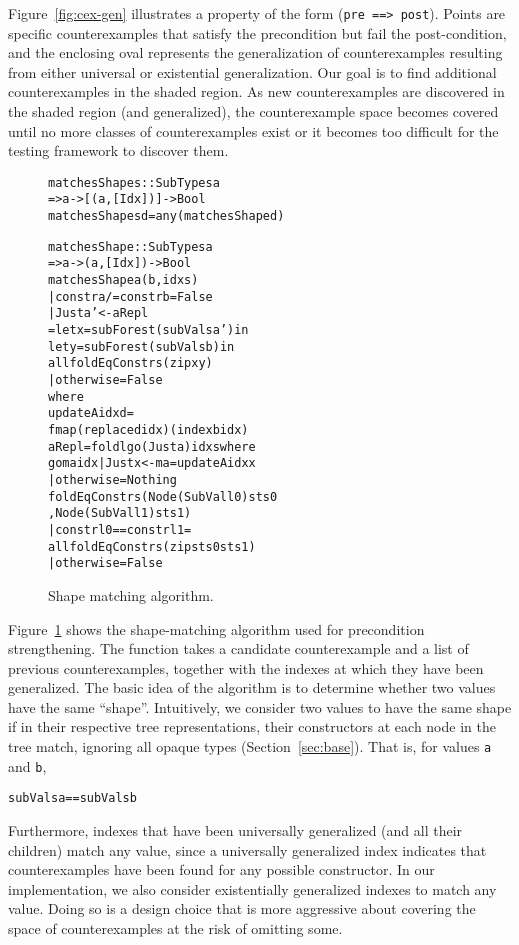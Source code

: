 \documentclass{sigplanconf}
\newenvironment{code}{\begin{alltt}\footnotesize}{\end{alltt}}
\newcommand{\ttp}[1]{\texttt{#1}}
\begin{document}
Figure~\ref{fig:cex-gen} illustrates a property of the form (\ttp{pre ==>
  post}).  Points are specific counterexamples that satisfy the precondition but
fail the post-condition, and the enclosing oval represents the generalization of
counterexamples resulting from either universal or existential generalization.
Our goal is to find additional counterexamples in the shaded region.  As new
counterexamples are discovered in the shaded region (and generalized), the
counterexample space becomes covered until no more classes of counterexamples
exist or it becomes too difficult for the testing framework to discover them.

\begin{figure}
  \begin{code}
matchesShapes :: SubTypes a
  => a -> [(a,[Idx])] -> Bool
matchesShapes d = any (matchesShape d)

matchesShape :: SubTypes a
  => a -> (a, [Idx]) -> Bool
matchesShape a (b, idxs)
  | constr a /= constr b = False
  | Just a' <- aRepl
  = let x = subForest (subVals a') in
    let y = subForest (subVals b)  in
    all foldEqConstrs (zip x y)
  | otherwise = False
  where
  updateA idx d =
    fmap (replace d idx) (index b idx)
  aRepl = foldl go (Just a) idxs where
    go ma idx | Just x <- ma = updateA idx x
              | otherwise    = Nothing
  foldEqConstrs ( Node (SubVal l0) sts0
                , Node (SubVal l1) sts1 )
    | constr l0 == constr l1 =
      all foldEqConstrs (zip sts0 sts1)
    | otherwise              = False
  \end{code}
  \caption{Shape matching algorithm.}
  \label{fig:matches}
\end{figure}

Figure~\ref{fig:matches} shows the shape-matching algorithm used for precondition
strengthening.  The function takes a candidate counterexample and a list of
previous counterexamples, together with the indexes at which they have been
generalized.  The basic idea of the algorithm is to determine whether two values
have the same ``shape''.  Intuitively, we consider two values to have the same
shape if in their respective tree representations, their constructors at each
node in the tree match, ignoring all opaque types (Section~\ref{sec:base}).
That is, for values \ttp{a} and \ttp{b},
%
\begin{code}
subVals a == subVals b
\end{code}
%
\noindent
Furthermore, indexes that have been universally generalized (and all their
children) match any value, since a universally generalized index indicates that
counterexamples have been found for any possible constructor.  In our
implementation, we also consider existentially generalized indexes to match any
value.  Doing so is a design choice that is more aggressive about covering the
space of counterexamples at the risk of omitting some.
\end{document}
